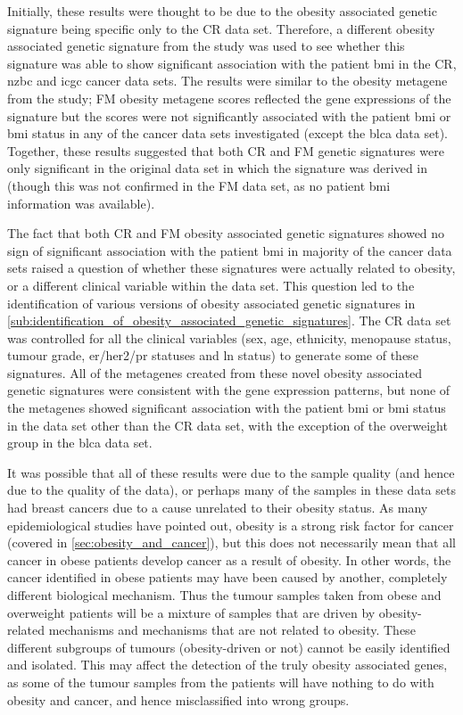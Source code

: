 Initially, these results were thought to be due to the obesity associated genetic signature being specific only to the CR data set.
Therefore, a different obesity associated genetic signature from the \citet{Fuentes-Mattei2014} study was used to see whether this signature was able to show significant association with the patient \gls{bmi} in the CR, \gls{nzbc} and \gls{icgc} cancer data sets.
The results were similar to the obesity metagene from the \citet{Creighton2012} study; FM obesity metagene scores reflected the gene expressions of the signature but the scores were not significantly associated with the patient \gls{bmi} or \gls{bmi} status in any of the cancer data sets investigated (except the \gls{blca} data set).
Together, these results suggested that both CR and FM genetic signatures were only significant in the original data set in which the signature was derived in (though this was not confirmed in the FM data set, as no patient \gls{bmi} information was available).

The fact that both CR and FM obesity associated genetic signatures showed no sign of significant association with the patient \gls{bmi} in majority of the cancer data sets raised a question of whether these signatures were actually related to obesity, or a different clinical variable within the data set.
This question led to the identification of various versions of obesity associated genetic signatures in \cref{sub:identification_of_obesity_associated_genetic_signatures}.
The CR data set was controlled for all the clinical variables (sex, age, ethnicity, menopause status, tumour grade, \gls{er}/\gls{her2}/\gls{pr} statuses and \gls{ln} status) to generate some of these signatures.
All of the metagenes created from these novel obesity associated genetic signatures were consistent with the gene expression patterns, but none of the metagenes showed significant association with the patient \gls{bmi} or \gls{bmi} status in the data set other than the CR data set, with the exception of the overweight group in the \gls{blca} data set.

It was possible that all of these results were due to the sample quality (and hence due to the quality of the data), or perhaps many of the samples in these data sets had breast cancers due to a cause unrelated to their obesity status.
As many epidemiological studies have pointed out, obesity is a strong risk factor for cancer (covered in \cref{sec:obesity_and_cancer}), but this does not necessarily mean that all cancer in obese patients develop cancer as a result of obesity.
In other words, the cancer identified in obese patients may have been caused by another, completely different biological mechanism.
Thus the tumour samples taken from obese and overweight patients will be a mixture of samples that are driven by obesity-related mechanisms and mechanisms that are not related to obesity.
These different subgroups of tumours (obesity-driven or not) cannot be easily identified and isolated.
This may affect the detection of the truly obesity associated genes, as some of the tumour samples from the patients will have nothing to do with obesity and cancer, and hence misclassified into wrong groups.

